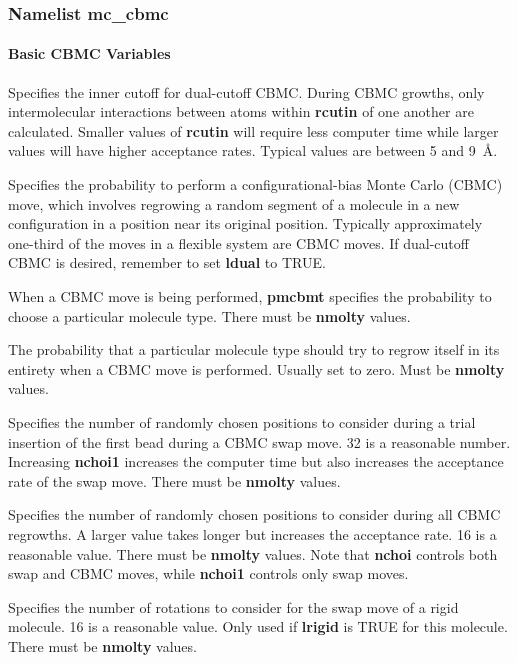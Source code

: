 \documentclass[12pt,letterpaper]{article}
\begin{document}
\subsubsection{Namelist \textbf{mc\_cbmc}}
\paragraph{Basic CBMC Variables}

 Specifies the inner cutoff for
dual-cutoff CBMC. During CBMC growths, only intermolecular
interactions between atoms within {\bf rcutin} of one
another are calculated. Smaller values of {\bf rcutin} will
require less computer time while larger values will have
higher acceptance rates. Typical values are between 5 and
9~\AA.

 Specifies the probability to perform a
configurational-bias Monte Carlo (CBMC) move, which involves
regrowing a random segment of a molecule in a new
configuration in a position near its original position.
Typically approximately one-third of the moves in a flexible
system are CBMC moves. If dual-cutoff CBMC is desired,
remember to set {\bf ldual} to TRUE.

 When a CBMC move is being performed,
{\bf pmcbmt} specifies the probability to choose a particular
molecule type. There must be {\bf nmolty} values.

 The probability that a particular
molecule type should try to regrow itself in its entirety
when a CBMC move is performed. Usually set to zero. Must be
{\bf nmolty} values.

 Specifies the number of randomly
chosen positions to consider during a trial insertion of the
first bead during a CBMC swap move. 32 is a reasonable
number. Increasing {\bf nchoi1} increases the computer time
but also increases the acceptance rate of the swap move.
There must be {\bf nmolty} values.

 Specifies the number of randomly
chosen positions to consider during all CBMC regrowths. A
larger value takes longer but increases the acceptance rate.
16 is a reasonable value. There must be {\bf nmolty} values.
Note that {\bf nchoi} controls both swap and CBMC moves,
while {\bf nchoi1} controls only swap moves.

 Specifies the number of rotations to
consider for the swap move of a rigid molecule. 16 is a
reasonable value. Only used if {\bf lrigid} is TRUE for this
molecule. There must be {\bf nmolty} values.
\end{document}
